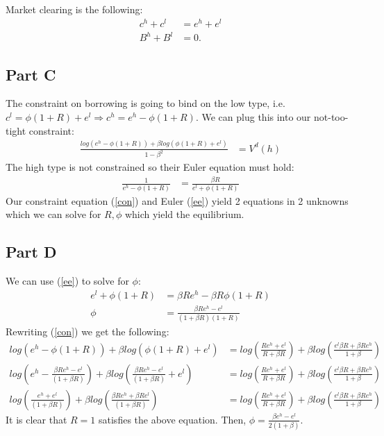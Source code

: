 \documentclass[11pt]{article} %
\begin{document}
Market clearing is the following:
\begin{align*}
c^h + c^l &= e^h + e^l\\
B^h + B^l &= 0.
\end{align*}
\subsection{Part C}
The constraint on borrowing is going to bind on the low type, i.e. $c^l= \phi(1+R) + e^l \Rightarrow c^h = e^h - \phi(1+R)$. We can plug this into our not-too-tight constraint:
\begin{align}
\frac{log(e^h - \phi(1+R))+\beta log(\phi(1+R) + e^l)}{1-\beta^2} &= V^d(h) \label{con}
\end{align}
The high type is not constrained so their Euler equation must hold:
\begin{align}
\frac{1}{e^h - \phi(1+R)} &= \frac{\beta R}{e^l + \phi(1+R)} \label{ee}
\end{align}
Our constraint equation (\ref{con}) and Euler (\ref{ee}) yield 2 equations in 2 unknowns which we can solve for $R,\phi$ which yield the equilibrium.
\subsection{Part D}
We can use (\ref{ee}) to solve for $\phi$:
\begin{align*}
e^l + \phi(1+R)&= \beta R e^h - \beta R \phi(1+R)\\
\phi &= \frac{\beta R e^h - e^l}{(1+\beta R)(1+R)}
\end{align*}
Rewriting (\ref{con}) we get the following:
\begin{align*}
log(e^h - \phi(1+R))+\beta log(\phi(1+R) + e^l) &= log\left(\frac{Re^h + e^l}{R+\beta R}\right) + \beta log\left( \frac{e^l \beta R + \beta R e^h }{1+\beta }\right) \\
log\left(e^h - \frac{\beta R e^h - e^l}{(1+\beta R)}\right)+\beta log\left( \frac{\beta R e^h - e^l}{(1+\beta R)} + e^l\right) &= log\left(\frac{Re^h + e^l}{R+\beta R}\right) + \beta log\left( \frac{e^l \beta R + \beta R e^h }{1+\beta }\right) \\
log\left(\frac{e^h + e^l}{(1+\beta R)}\right)+\beta log\left( \frac{\beta R e^h + \beta Re^l}{(1+\beta R)} \right) &= log\left(\frac{Re^h + e^l}{R+\beta R}\right) + \beta log\left( \frac{e^l \beta R + \beta R e^h }{1+\beta }\right) 
\end{align*}
It is clear that $R=1$ satisfies the above equation. Then, $\phi = \frac{\beta e^h - e^l}{2(1+\beta )} $.
\end{document}
